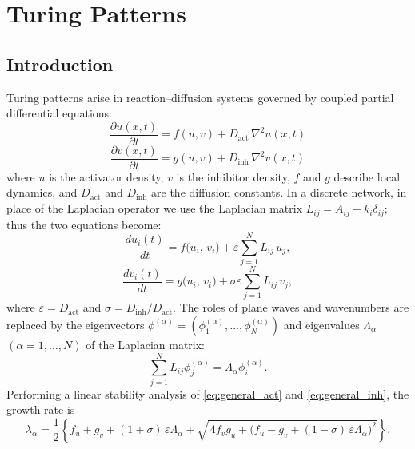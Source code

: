 \chapter{Turing Patterns}


\section{Introduction}
Turing patterns arise in reaction–diffusion systems governed by coupled partial differential equations:
\begin{equation}
\frac{\partial u(x,t)}{\partial t}
= f(u,v) + D_{\text{act}} \,\nabla^{2} u(x,t)
\end{equation}
\begin{equation}
\frac{\partial v(x,t)}{\partial t}
= g(u,v) + D_{\text{inh}} \,\nabla^{2} v(x,t)
\end{equation}
where \(u\) is the activator density, \(v\) is the inhibitor density, \(f\) and \(g\) describe local dynamics, and \(D_{\text{act}}\) and \(D_{\text{inh}}\) are the diffusion constants.
In a discrete network, in place of the Laplacian operator we use the Laplacian matrix \(L_{ij} = A_{ij} - k_i\delta_{ij}\); thus the two equations become:
\begin{equation}
    \frac{d u_i(t)}{d t}
= f\bigl(u_i,\, v_i\bigr)
+ \varepsilon \sum_{j=1}^{N} L_{ij}\, u_j,
\label{eq:general_act}
\end{equation}
\begin{equation}
    \frac{d v_i(t)}{d t}
= g\bigl(u_i,\, v_i\bigr)
+ \sigma \varepsilon \sum_{j=1}^{N} L_{ij}\, v_j,
\label{eq:general_inh}
\end{equation}
where \(\varepsilon = D_{\text{act}}\) and \(\sigma = D_{\text{inh}}/D_{\text{act}}\). The roles of plane waves and wavenumbers are replaced by the eigenvectors \(\phi^{(\alpha)} = (\phi_1^{(\alpha)}, \ldots, \phi_N^{(\alpha)})\) and eigenvalues \(\Lambda_{\alpha}\) \((\alpha=1, \ldots, N)\) of the Laplacian matrix:
\begin{equation}
    \sum_{j=1}^N L_{ij}\phi_j^{(\alpha)} = \Lambda_\alpha\phi_i^{(\alpha)}.
\end{equation}
Performing a linear stability analysis of \eqref{eq:general_act} and \eqref{eq:general_inh}, the growth rate is
\begin{equation}
\lambda_{\alpha}
= \frac{1}{2}\left\{
  f_u + g_v + (1+\sigma)\,\varepsilon \Lambda_{\alpha}
  + \sqrt{\,4 f_v g_u + \bigl(f_u - g_v + (1-\sigma)\,\varepsilon \Lambda_{\alpha}\bigr)^2}
\right\}.
\end{equation}
